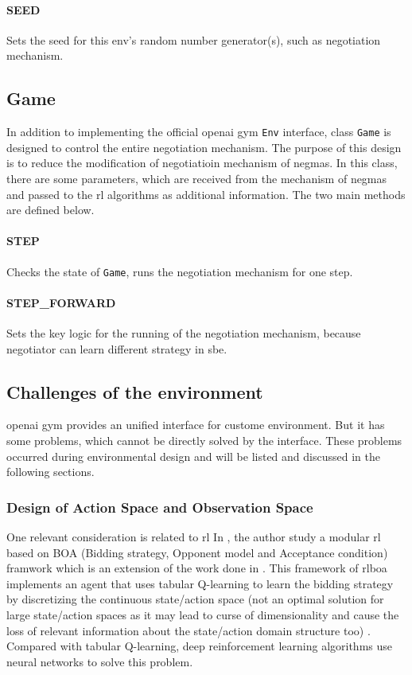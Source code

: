 \paragraph{SEED} Sets the seed for this env's random number generator(s), such as negotiation mechanism.

\subsection{Game} \label{game}
In addition to implementing the official \gls{openai gym} \texttt{Env} interface, class \texttt{Game} is designed to control the entire negotiation mechanism. The purpose of this design is to reduce the modification of negotiatioin mechanism of \gls{negmas}. In this class, there are some parameters, which are received from the mechanism of \gls{negmas} and passed to the \gls{rl} algorithms as additional information. The two main methods are defined below.
 
\paragraph{STEP} Checks the state of \texttt{Game}, runs the negotiation mechanism for one step.
\paragraph{STEP\_FORWARD} Sets the key logic for the running of the negotiation mechanism, because negotiator can learn different strategy in \gls{sbe}. 

\subsection{Challenges of the environment}
\gls{openai gym} provides an unified interface for custome environment. But it has some problems, which cannot be directly solved by the interface. These problems occurred during environmental design and will be listed and discussed in the following sections. 

\subsubsection{Design of Action Space and Observation Space}
One relevant consideration is related to \gls{rl} In \parencite{Bakker2019RLBOAAM}, the author study a modular \gls{rl} based on BOA (Bidding strategy, Opponent model and Acceptance condition) framwork which is an extension of the work done in \parencite{Bakker2019RLBOAAM}. This framework of \gls{rlboa} implements an agent that uses tabular Q-learning to learn the bidding strategy by discretizing the continuous state/action space (not an optimal solution for large state/action spaces as it may lead to curse of dimensionality and cause the loss of relevant information about the state/action domain structure too) \parencite{bagga2020deep}. 
Compared with tabular Q-learning, deep reinforcement learning algorithms use neural networks to solve this problem.
 
